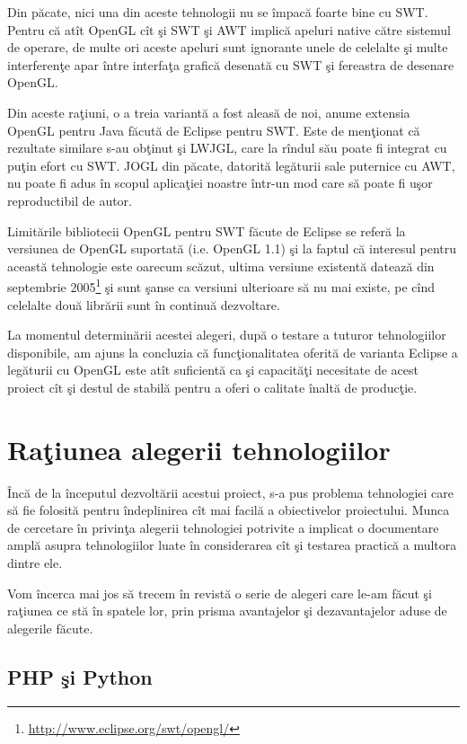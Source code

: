 Din păcate, nici una din aceste tehnologii nu se împacă foarte bine cu SWT. 
Pentru că atît OpenGL cît şi SWT şi AWT implică apeluri native către sistemul 
de operare, de multe ori aceste apeluri sunt ignorante unele de celelalte şi 
multe interferenţe apar între interfaţa grafică desenată cu SWT şi fereastra de 
desenare OpenGL.

Din aceste raţiuni, o a treia variantă a fost aleasă de noi, anume extensia 
OpenGL pentru Java făcută de Eclipse pentru SWT. Este de menţionat că rezultate 
similare s-au obţinut şi LWJGL, care la rîndul său poate fi integrat cu puţin 
efort cu SWT. JOGL din păcate, datorită legăturii sale puternice cu AWT, nu 
poate fi adus în scopul aplicaţiei noastre într-un mod care să poate fi uşor 
reproductibil de autor.

Limitările bibliotecii OpenGL pentru SWT făcute de Eclipse se referă la 
versiunea de OpenGL suportată (i.e. OpenGL 1.1) şi la faptul că interesul 
pentru această tehnologie este oarecum scăzut, ultima versiune existentă 
datează din septembrie 2005\footnote{\url{http://www.eclipse.org/swt/opengl/}} 
şi sunt şanse ca versiuni ulterioare să nu mai existe, pe cînd celelalte două 
librării sunt în continuă dezvoltare.

La momentul determinării acestei alegeri, după o testare a tuturor 
tehnologiilor disponibile, am ajuns la concluzia că funcţionalitatea oferită de 
varianta Eclipse a legăturii cu OpenGL este atît suficientă ca şi capacităţi 
necesitate de acest proiect cît şi destul de stabilă pentru a oferi o calitate 
înaltă de producţie.

\section{Raţiunea alegerii tehnologiilor}

Încă de la începutul dezvoltării acestui proiect, s-a pus problema tehnologiei 
care să fie folosită pentru îndeplinirea cît mai facilă a obiectivelor 
proiectului. Munca de cercetare în privinţa alegerii tehnologiei potrivite a 
implicat o documentare amplă asupra tehnologiilor luate în considerarea cît şi 
testarea practică a multora dintre ele.

Vom încerca mai jos să trecem în revistă o serie de alegeri care le-am făcut şi 
raţiunea ce stă în spatele lor, prin prisma avantajelor şi dezavantajelor aduse 
de alegerile făcute.

\subsection{PHP şi Python}

